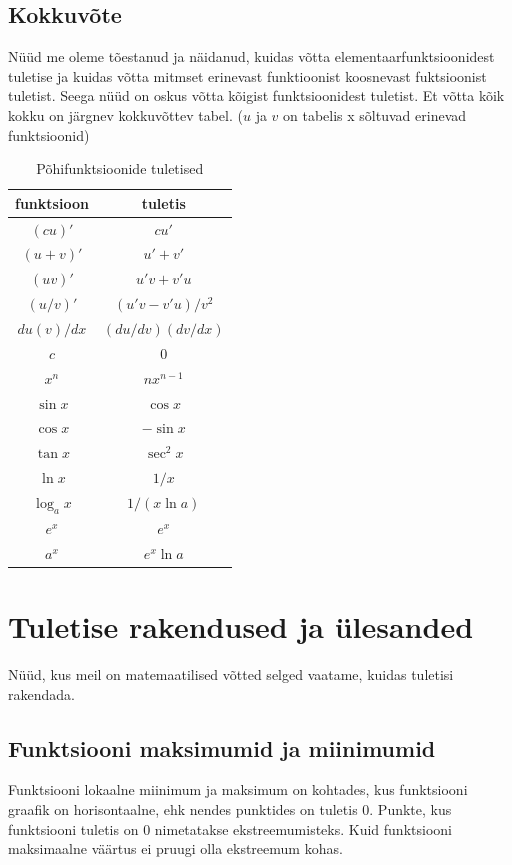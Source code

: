 \documentclass[a4paper,11pt,twocolumn]{article}
\begin{document}
\subsection{Kokkuvõte}
Nüüd me oleme tõestanud ja näidanud, kuidas võtta elementaarfunktsioonidest tuletise ja kuidas võtta mitmset erinevast funktioonist koosnevast fuktsioonist tuletist. Seega nüüd on oskus võtta kõigist funktsioonidest tuletist. Et võtta kõik kokku on järgnev kokkuvõttev tabel. ($u$ ja $v$ on tabelis x sõltuvad erinevad funktsioonid)

\begin{table}[h]
  \centering
  \caption{Põhifunktsioonide tuletised}
  \begin{tabular}{c | c}
    \hline
    funktsioon & tuletis\\
    \hline
    $(cu)'$ & $cu'$\\
    $(u+v)'$ & $u'+v'$\\
    $(uv)'$ & $u'v+v'u$\\
    $(u/v)'$ & $(u'v-v'u)/v^2$\\
    $du(v)/dx$ & $(du/dv)(dv/dx)$\\
    \hline
    $c$ & $0$\\
    $x^n$ & $nx^{n-1}$ \\
    $\sin x$ & $\cos x$\\
    $\cos x$ & $-\sin x$\\
    $\tan x$ & $\sec^2 x$\\
    $\ln x$ & $1/x$\\
    $\log_a x$ & $1/(x\ln a)$\\
    $e^x$ & $e^x$\\
    $a^x$ & $e^x\ln a$    
  \end{tabular}
\end{table}

\section{Tuletise rakendused ja ülesanded}
Nüüd, kus meil on matemaatilised võtted selged vaatame, kuidas tuletisi rakendada.

\subsection{Funktsiooni maksimumid ja miinimumid}
Funktsiooni lokaalne miinimum ja maksimum on kohtades, kus funktsiooni graafik on horisontaalne, ehk nendes punktides on tuletis $0$. Punkte, kus funktsiooni tuletis on $0$ nimetatakse ekstreemumisteks. Kuid funktsiooni maksimaalne väärtus ei pruugi olla  ekstreemum kohas.
\end{document}
